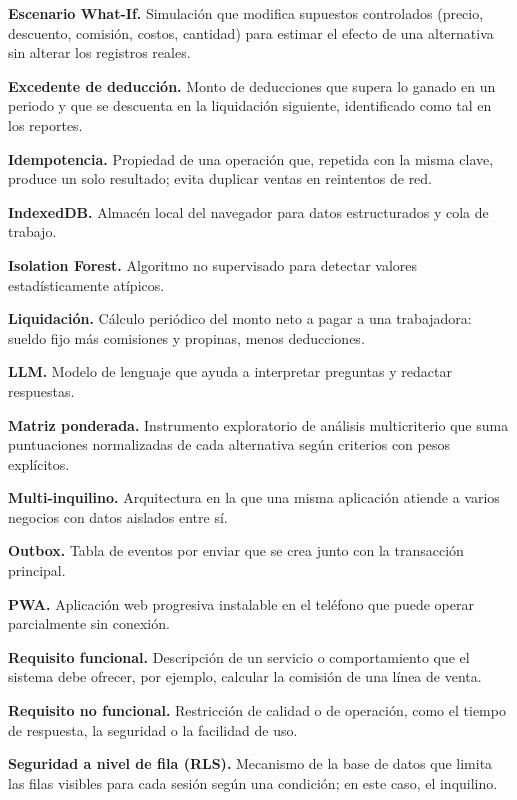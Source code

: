 \noindent \textbf{Escenario What-If.} Simulación que modifica supuestos controlados (precio, descuento, comisión, costos, cantidad) para estimar el efecto de una alternativa sin alterar los registros reales.

\noindent \textbf{Excedente de deducción.} Monto de deducciones que supera lo ganado en un periodo y que se descuenta en la liquidación siguiente, identificado como tal en los reportes.

\noindent \textbf{Idempotencia.} Propiedad de una operación que, repetida con la misma clave, produce un solo resultado; evita duplicar ventas en reintentos de red.

\noindent \textbf{IndexedDB.} Almacén local del navegador para datos estructurados y cola de trabajo.

\noindent \textbf{Isolation Forest.} Algoritmo no supervisado para detectar valores estadísticamente atípicos.

\noindent \textbf{Liquidación.} Cálculo periódico del monto neto a pagar a una trabajadora: sueldo fijo más comisiones y propinas, menos deducciones.

\noindent \textbf{LLM.} Modelo de lenguaje que ayuda a interpretar preguntas y redactar respuestas.

\noindent \textbf{Matriz ponderada.} Instrumento exploratorio de análisis multicriterio que suma puntuaciones normalizadas de cada alternativa según criterios con pesos explícitos.

\noindent \textbf{Multi-inquilino.} Arquitectura en la que una misma aplicación atiende a varios negocios con datos aislados entre sí.

\noindent \textbf{Outbox.} Tabla de eventos por enviar que se crea junto con la transacción principal.

\noindent \textbf{PWA.} Aplicación web progresiva instalable en el teléfono que puede operar parcialmente sin conexión.

\noindent \textbf{Requisito funcional.} Descripción de un servicio o comportamiento que el sistema debe ofrecer, por ejemplo, calcular la comisión de una línea de venta.

\noindent \textbf{Requisito no funcional.} Restricción de calidad o de operación, como el tiempo de respuesta, la seguridad o la facilidad de uso.

\noindent \textbf{Seguridad a nivel de fila (RLS).} Mecanismo de la base de datos que limita las filas visibles para cada sesión según una condición; en este caso, el inquilino.


